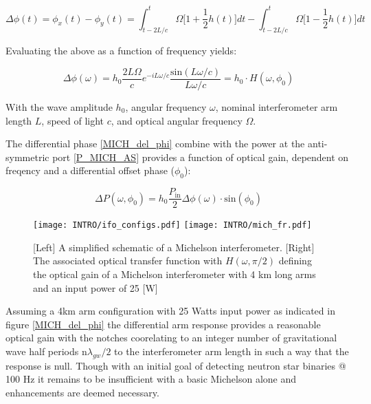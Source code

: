 \begin{equation}
\Delta \phi(t) = \phi_x(t) - \phi_y(t) =  \int_{t-2L/c}^{t} \Omega \bigg[1 + \frac{1}{2}h(t)\bigg]dt - \int_{t-2L/c}^{t} \Omega \bigg[1 - \frac{1}{2}h(t)\bigg]dt 
\end{equation}

Evaluating the above as a function of frequency yields:

\begin{equation}\label{MICH_del_phi}
	\Delta \phi (\omega) = h_0\frac{2 L \Omega}{c}e^{-i L \omega / c} \frac{\mathrm{sin}(L \omega /c)}{L \omega /c} = h_0 \cdot H(\omega, \phi_0)
\end{equation}

With the wave amplitude $h_0$, angular frequency $\omega$, nominal interferometer arm length $L$, speed of light $c$, and optical angular frequency $\Omega$.

The differential phase \ref{MICH_del_phi} combine with the power at the anti-symmetric port \ref{P_MICH_AS} provides a function of optical gain, dependent on freqency and a differential offset phase ($\phi_0$):

\begin{equation}
	\Delta P(\omega, \phi_0) = h_0 \frac{P_\mathrm{in}}{2} \Delta \phi (\omega) \cdot \mathrm{sin}(\phi_0)
\end{equation}

\begin{figure}[ht!]
	\begin{subcaptiongroup}
		\texttt{[image: INTRO/ifo\_configs.pdf]}
		\texttt{[image: INTRO/mich\_fr.pdf]}
 	\end{subcaptiongroup}
  	\hfill
	\caption{[Left] A simplified schematic of a Michelson interferometer. [Right] The associated optical transfer function with $H(\omega, \pi/2)$ defining the optical gain of a Michelson interferometer with 4 km long arms and an input power of 25 [W]}
	\label{fig:mich}
\end{figure}
\FloatBarrier

Assuming a 4km arm configuration with 25 Watts input power as indicated in figure \ref{MICH_del_phi} the differential arm response provides a reasonable optical gain with the notches coorelating to an integer number of gravitational wave half periods $\mathrm{n}\lambda_{gw} / 2$ to the interferometer arm length in such a way that the response is null. Though with an initial goal of detecting neutron star binaries @ 100 Hz it remains to be insufficient with a basic Michelson alone and enhancements are deemed necessary.  


